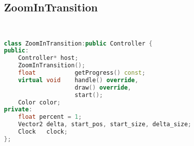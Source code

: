 \subsection{ZoomInTransition}
\begin{lstlisting}[language=C++]


class ZoomInTransition:public Controller {
public:
    Controller* host;
    ZoomInTransition();
    float           getProgress() const;
    virtual void    handle() override,
                    draw() override,
                    start();
    Color color;
private:
    float percent = 1;
    Vector2 delta, start_pos, start_size, delta_size;
    Clock   clock;
};

\end{lstlisting}

